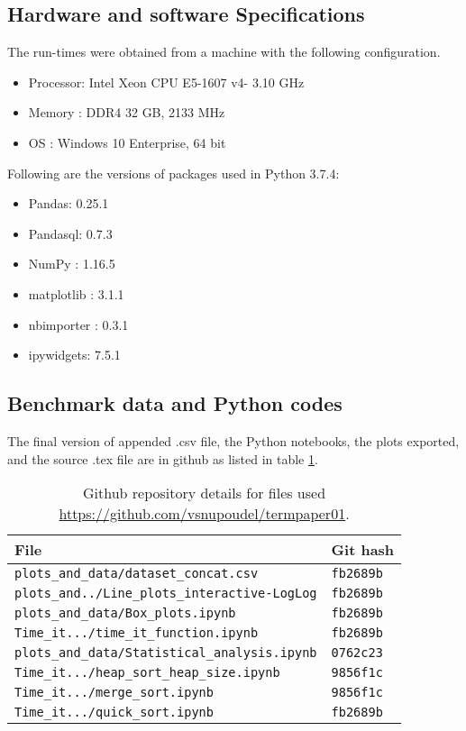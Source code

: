\documentclass[sigconf, nonacm, natbib, screen, balance=False]{acmart}
\begin{document}
\subsection{Hardware and software Specifications}\label{sec:hardwares and softwares}
The run-times were obtained from a machine with the following configuration. 

\begin{itemize}
\item Processor:    Intel Xeon CPU E5-1607 v4- 3.10 GHz
\item Memory :      DDR4 32 GB, 2133 MHz
\item OS :          Windows 10 Enterprise, 64 bit
\end{itemize}


Following are the versions of packages used in Python 3.7.4:
\begin{multicols}{2}
\begin{itemize}
\item Pandas:    0.25.1
\item Pandasql:    0.7.3
\item NumPy :      1.16.5
\item matplotlib :   3.1.1
\item nbimporter :  0.3.1
\item ipywidgets: 7.5.1
\end{itemize}
\end{multicols}

\subsection{Benchmark data and Python codes}\label{sec:githubfiles}
The final version of appended .csv file, the Python notebooks, the plots exported, and the source .tex file are in github as listed in table \ref{tab:hashes}.

\begin{table}[ht]
\caption{Github repository details for files used 
\url{https://github.com/vsnupoudel/termpaper01}.}
\label{tab:hashes}
\begin{tabular}{|l|l|}
\hline
File & Git hash 
\\\hline
\verb!plots_and_data/dataset_concat.csv! & \verb!fb2689b! \\
\verb!plots_and../Line_plots_interactive-LogLog! & \verb!fb2689b! \\
\verb!plots_and_data/Box_plots.ipynb! & \verb!fb2689b! \\
\verb!Time_it.../time_it_function.ipynb! & \verb!fb2689b! \\
\verb!plots_and_data/Statistical_analysis.ipynb! & \verb!0762c23! \\
\verb!Time_it.../heap_sort_heap_size.ipynb!	& \verb!9856f1c! \\
\verb!Time_it.../merge_sort.ipynb! & \verb!9856f1c! \\
\verb!Time_it.../quick_sort.ipynb! & \verb!fb2689b!  \\
\hline
\end{tabular}
\end{table}
\end{document}
